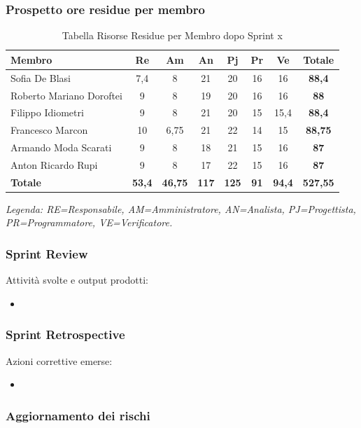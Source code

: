 \subsubsection{Prospetto ore residue per membro}
\begin{table}[H]
    \centering
    \renewcommand{\arraystretch}{1.3}
    \begin{tabularx}{\textwidth}{|X|c|c|c|c|c|c|c|}
        \hline
        \textbf{Membro} & \textbf{Re} & \textbf{Am} & \textbf{An} & \textbf{Pj} & \textbf{Pr} & \textbf{Ve} & \textbf{Totale} \\
        \hline
        Sofia De Blasi & 7,4 & 8 & 21 & 20 & 16 & 16 & \textbf{88,4} \\
        Roberto Mariano Doroftei & 9 & 8 & 19 & 20 & 16 & 16 & \textbf{88} \\
        Filippo Idiometri & 9 & 8 & 21 & 20 & 15 & 15,4 & \textbf{88,4} \\
        Francesco Marcon & 10 & 6,75 & 21 & 22 & 14 & 15 & \textbf{88,75} \\
        Armando Moda Scarati & 9 & 8 & 18 & 21 & 15 & 16 & \textbf{87} \\
        Anton Ricardo Rupi & 9 & 8 & 17 & 22 & 15 & 16 & \textbf{87} \\
        \hline
        \textbf{Totale} & \textbf{53,4} & \textbf{46,75} & \textbf{117} & \textbf{125} & \textbf{91} & \textbf{94,4} & \textbf{527,55} \\
        \hline
    \end{tabularx}
    \begin{minipage}{\textwidth}
        \smallskip
        \footnotesize\textit{Legenda: RE=Responsabile, AM=Amministratore,
        AN=Analista, PJ=Progettista, PR=Programmatore, VE=Verificatore.}
    \end{minipage}
    \caption{Tabella Risorse Residue per Membro dopo Sprint x}
\end{table}

\subsubsection{Sprint Review}
Attività svolte e output prodotti:
\begin{itemize}
    \item 
\end{itemize}

\subsubsection{Sprint Retrospective}
Azioni correttive emerse:
\begin{itemize}
    \item 
\end{itemize}

\subsubsection{Aggiornamento dei rischi}

